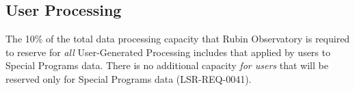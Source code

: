 \subsection{User Processing}\label{ssec:req_ug}

The 10\% of the total data processing capacity that Rubin Observatory is 
required to reserve for \emph{all} User-Generated Processing includes that 
applied by users to Special Programs data.
There is no additional capacity {\it for users} that will be reserved only for Special 
Programs data (LSR-REQ-0041).
